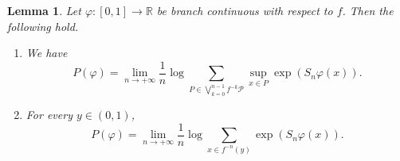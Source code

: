 \documentclass[10pt,a4paper]{amsart}
\numberwithin{equation}{section} %
\numberwithin{figure}{section} %
\newtheorem{lemm}[prop]{Lemma}
\newcommand{\R}{\mathbb{R}}
\renewcommand{\=}{\coloneqq}
\begin{document}
\begin{lemm}\label{tree pressure}
    Let $\varphi:[0,1]\to\R$ be branch continuous with respect to $f$. Then the following hold.
    \begin{enumerate}
    \item[1.] We have
    \begin{equation}\label{eq lemma tree pressure part 1}
        P(\varphi) = \lim_{n\to +\infty}\frac{1}{n} \log \sum_{P\in \bigvee_{k=0}^{n-1}f^{-k} \mathcal{P}} \sup_{x\in P}\exp(S_n\varphi(x)).
    \end{equation}
    \item[2.] For every $y\in(0,1)$,
    \begin{equation}\label{eq lemma tree pressure part 2}
        P(\varphi) = \lim_{n\to+\infty} \frac{1}{n} \log \sum_{x\in f^{-n}(y)} \exp(S_n \varphi(x)).
    \end{equation}
    \end{enumerate}
\end{lemm}
\end{document}
